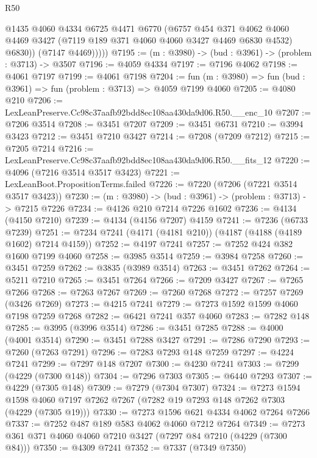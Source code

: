 \begin{lexlean}{R50}
\begin{coremodule}
              @1435
              @4060
              @4334
              @6725
              @4471
              @6770
              (@6757
                @454
                @371
                @4062
                @4060
                @4469
                @3427
                (@7119 @189 @371 @4060 @4060 @3427 @4469 @6830 @4532)
                @6830))
            (@7147 @4469)))))
@7195 := (m : @3980) -> (bud : @3961) -> (problem : @3713) -> @3507
@7196 := @4059 @4334
@7197 := @7196 @4062
@7198 := @4061 @7197
@7199 := @4061 @7198
@7204 := fun (m : @3980) => fun (bud : @3961) => fun (problem : @3713) => @4059 @7199 @4060
@7205 := @4080 @210
@7206 := LexLeanPreserve.Cc98c37aafb92bdd8ec108aa430da9d06.R50.__enc_10
@7207 := @7206 @3514
@7208 := @3451 @7207
@7209 := @3451 @6731
@7210 := @3994 @3423
@7212 := @3451 @7210 @3427
@7214 := @7208 (@7209 @7212)
@7215 := @7205 @7214
@7216 := LexLeanPreserve.Cc98c37aafb92bdd8ec108aa430da9d06.R50.__fits_12
@7220 := @4096 (@7216 @3514 @3517 @3423)
@7221 := LexLeanBoot.PropositionTerms.failed
@7226 := @7220 (@7206 (@7221 @3514 @3517 @3423))
@7230 := (m : @3980) -> (bud : @3961) -> (problem : @3713) -> @7215 @7226
@7234 := @4126 @210 @7214 @7226 @1602
@7236 := @4134 (@4150 @7210)
@7239 := @4134 (@4156 @7207) @4159
@7241 := @7236 (@6733 @7239)
@7251 := @7234 @7241 (@4171 (@4181 @210)) (@4187 (@4188 (@4189 @1602) @7214 @4159))
@7252 := @4197 @7241
@7257 := @7252 @424 @382 @1600 @7199 @4060
@7258 := @3985 @3514
@7259 := @3984 @7258
@7260 := @3451 @7259
@7262 := @3835 (@3989 @3514)
@7263 := @3451 @7262
@7264 := @5211 @7210
@7265 := @3451 @7264
@7266 := @7209 @3427
@7267 := @7265 @7266
@7268 := @7263 @7267
@7269 := @7260 @7268
@7272 := @7257 @7269 (@3426 @7269)
@7273 := @4215 @7241
@7279 := @7273 @1592 @1599 @4060 @7198 @7259 @7268
@7282 := @6421 @7241 @357 @4060
@7283 := @7282 @148
@7285 := @3995 (@3996 @3514)
@7286 := @3451 @7285
@7288 := @4000 (@4001 @3514)
@7290 := @3451 @7288 @3427
@7291 := @7286 @7290
@7293 := @7260 (@7263 @7291)
@7296 := @7283 @7293 @148 @7259
@7297 := @4224 @7241
@7299 := @7297 @148 @7207
@7300 := @4230 @7241
@7303 := @7299 (@4229 (@7300 @148))
@7304 := @7296 @7303
@7305 := @6440 @7293
@7307 := @4229 (@7305 @148)
@7309 := @7279 (@7304 @7307)
@7324 := @7273
    @1594
    @1598
    @4060
    @7197
    @7262
    @7267
    (@7282 @19 @7293 @148 @7262 @7303 (@4229 (@7305 @19)))
@7330 := @7273 @1596 @621 @4334 @4062 @7264 @7266
@7337 := @7252 @487 @189 @583 @4062 @4060 @7212 @7264
@7349 := @7273 @361 @371 @4060 @4060 @7210 @3427 (@7297 @84 @7210 (@4229 (@7300 @84)))
@7350 := @4309 @7241
@7352 := @7337 (@7349 @7350)

\end{coremodule}
\end{lexlean}
